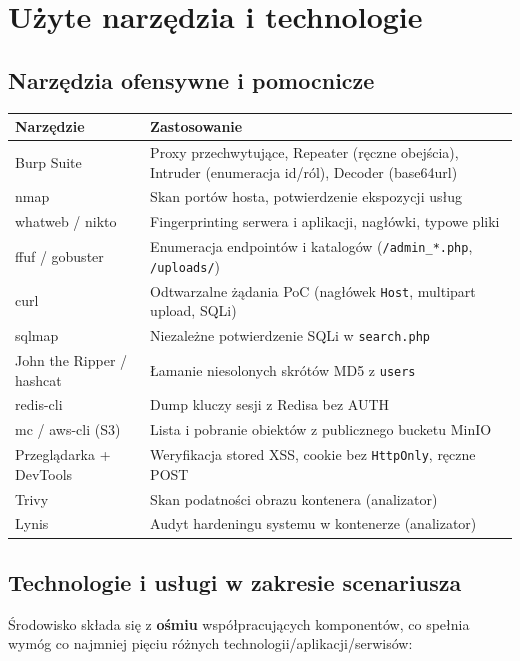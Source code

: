 \documentclass[11pt,a4paper]{article}
\begin{document}
\section{Użyte narzędzia i technologie}
\label{sec:tools}

\subsection{Narzędzia ofensywne i pomocnicze}
\begin{center}
\begin{tabularx}{\textwidth}{@{}l L@{}}
\toprule
\textbf{Narzędzie} & \textbf{Zastosowanie} \\
\midrule
Burp Suite & Proxy przechwytujące, Repeater (ręczne obejścia), Intruder (enumeracja id/ról), Decoder (base64url) \\
nmap & Skan portów hosta, potwierdzenie ekspozycji usług \\
whatweb / nikto & Fingerprinting serwera i aplikacji, nagłówki, typowe pliki \\
ffuf / gobuster & Enumeracja endpointów i katalogów (\texttt{/admin\_*.php}, \texttt{/uploads/}) \\
curl & Odtwarzalne żądania PoC (nagłówek \texttt{Host}, multipart upload, SQLi) \\
sqlmap & Niezależne potwierdzenie SQLi w \texttt{search.php} \\
John the Ripper / hashcat & Łamanie niesolonych skrótów MD5 z \texttt{users} \\
redis-cli & Dump kluczy sesji z Redisa bez AUTH \\
mc / aws-cli (S3) & Lista i pobranie obiektów z publicznego bucketu MinIO \\
Przeglądarka + DevTools & Weryfikacja stored XSS, cookie bez \texttt{HttpOnly}, ręczne POST \\
Trivy & Skan podatności obrazu kontenera (analizator) \\
Lynis & Audyt hardeningu systemu w kontenerze (analizator) \\
\bottomrule
\end{tabularx}
\end{center}

\subsection{Technologie i usługi w zakresie scenariusza}
Środowisko składa się z \textbf{ośmiu} współpracujących komponentów, co spełnia wymóg co najmniej
pięciu różnych technologii/aplikacji/serwisów:
\end{document}
